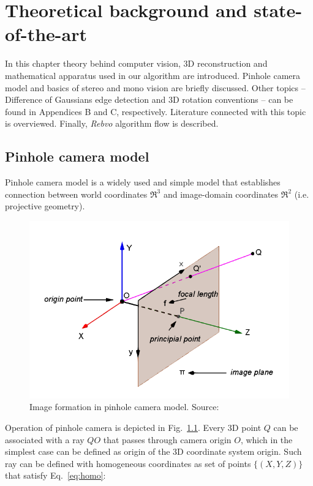 \chapter{Theoretical background and state-of-the-art}
\label{cha:intro}


In this chapter theory behind computer vision, 3D reconstruction and mathematical apparatus used in our algorithm are introduced. Pinhole camera model and basics of stereo and mono vision are briefly discussed. Other topics -- Difference of Gaussians edge detection and 3D rotation conventions -- can be found in Appendices B and C, respectively. Literature connected with this topic is overviewed. Finally, \textit{Rebvo} \cite{jose2015realtime} algorithm flow  is described.


\section{Pinhole camera model}
\label{sec:pinhole}

Pinhole camera model \cite{hartley2003multiple} is a widely used \cite{straight} and simple model that establishes connection between world coordinates $\Re^3$ and image-domain coordinates $\Re^2$ (i.e. projective geometry).

\begin{figure}[ht]
	\centering\includegraphics[width=0.8\linewidth]{img/projective.PNG}
	\caption{Image formation in pinhole camera model. Source: \cite{szczesny}}
	\label{fig:projective}
\end{figure}

Operation of pinhole camera is depicted in Fig.~\ref{fig:projective}. Every 3D point $Q$ can be associated with a ray $QO$ that passes through camera origin $O$, which in the simplest case can be defined as origin of the 3D coordinate system origin. Such ray can be defined with homogeneous coordinates as set of points $\{(X, Y, Z)\}$ that satisfy Eq.~\ref{eq:homo}:


